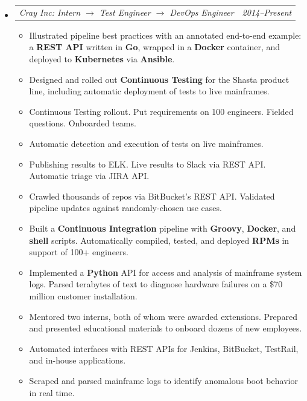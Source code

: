 \documentclass[12pt,letterpaper]{article}
\makeatletter
\newcommand{\headerpair}[2]{
    \begin{tabular*}{\linewidth}{l@{ \extracolsep{\fill} }r} {\large\emph{#1}} & {\large\emph{#2}}
    \end{tabular*}
}
\newcommand{\headerrow}[3]{\headerpair{#2: #1}{#3}}
\makeatother
\begin{document}
\begin{itemize}[leftmargin=\parindent]
    \parskip=0.1em
    \itemsep=1.2em
    \item[]
        \headerrow
            {Intern $\to$ Test Engineer $\to$ DevOps Engineer}
            {Cray Inc}
            {2014--Present}
        \begin{itemize}[leftmargin=\parindent]

            \item Illustrated pipeline best practices with an annotated end-to-end example: a \textbf{REST API} written in \textbf{Go}, wrapped in a \textbf{Docker} container, and deployed to \textbf{Kubernetes} via \textbf{Ansible}.



            \item Designed and rolled out \textbf{Continuous Testing} for the Shasta product line, including automatic deployment of tests to live mainframes.

            \item Continuous Testing rollout. Put requirements on 100 engineers. Fielded questions. Onboarded teams.
            \item Automatic detection and execution of tests on live mainframes.
            \item Publishing results to ELK. Live results to Slack via REST API. Automatic triage via JIRA API.


            \item Crawled thousands of repos via BitBucket's REST API. Validated pipeline updates against randomly-chosen use cases.

            \item Built a \textbf{Continuous Integration} pipeline with \textbf{Groovy}, \textbf{Docker}, and \textbf{shell} scripts. Automatically compiled, tested, and deployed \textbf{RPMs} in support of 100+ engineers.


            \item Implemented a \textbf{Python} API for access and analysis of mainframe system logs. Parsed terabytes of text to diagnose hardware failures on a \$70 million customer installation.

            \item Mentored two interns, both of whom were awarded extensions. Prepared and presented educational materials to onboard dozens of new employees.

            \item Automated interfaces with REST APIs for Jenkins, BitBucket, TestRail, and in-house applications.
            \item Scraped and parsed mainframe logs to identify anomalous boot behavior in real time.


\end{itemize}
\end{itemize}
\end{document}
